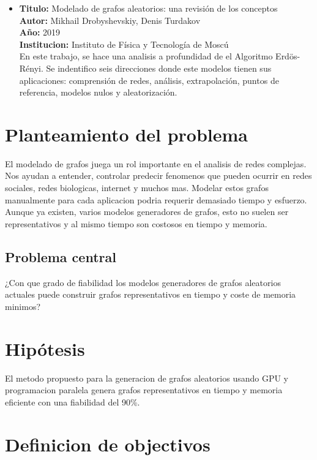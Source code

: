 \documentclass[11pt]{extarticle}
\begin{document}
\begin{itemize}
  \item \textbf{Titulo:} Modelado de grafos aleatorios: una revisión de los conceptos\\
  \textbf{Autor:} Mikhail Drobyshevskiy, Denis Turdakov\\
  \textbf{A\~no:} 2019\\
  \textbf{Institucion:} Instituto de Física y Tecnología de Moscú\\
  En este trabajo, se hace una analisis a profundidad de el Algoritmo Erdös-Rényi.
  Se indentifico seis direcciones donde este modelos tienen sus aplicaciones: comprensión de redes, análisis, extrapolación, puntos de referencia, modelos nulos y aleatorización. 

\end{itemize}



\section{Planteamiento del problema}
  El modelado de grafos juega un rol importante en el analisis de redes complejas. 
  Nos ayudan a entender, controlar predecir fenomenos que pueden ocurrir en redes sociales, 
  redes biologicas, internet y muchos mas. Modelar estos grafos manualmente para cada aplicacion podria requerir
  demasiado tiempo y esfuerzo. Aunque ya existen, varios modelos generadores de grafos, esto no suelen ser representativos
  y al mismo tiempo son costosos en tiempo y memoria.
  \subsection{Problema central}
     ¿Con que grado de fiabilidad los modelos generadores de grafos aleatorios actuales puede construir grafos representativos en tiempo y coste de memoria minimos? 

\section{Hip\'otesis}
  El metodo propuesto para la generacion de grafos aleatorios usando GPU y programacion paralela 
  genera grafos representativos en tiempo y memoria eficiente con una fiabilidad del 90\%.

\section{Definicion de objectivos}
\end{document}
